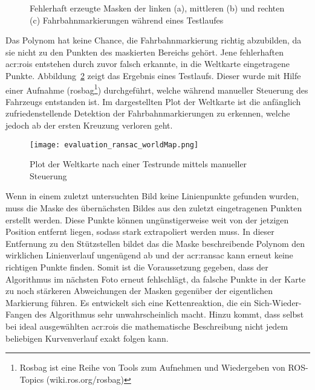 \begin{figure}[htbp]
	\centering
	\hfill
	\hfill
	\caption{Fehlerhaft erzeugte Masken der linken (a), mittleren (b) und rechten (c) Fahrbahnmarkierungen während eines Testlaufes}
	\label{fig:evaluation_ransac_ransac}
\end{figure} 

Das Polynom hat keine Chance, die Fahrbahnmarkierung richtig abzubilden, da sie nicht zu den Punkten des maskierten Bereichs gehört. Jene fehlerhaften \glspl{acr:roi} entstehen durch zuvor falsch erkannte, in die Weltkarte eingetragene Punkte. Abbildung~\ref{evaluation_ransac_weltkarte} zeigt das Ergebnis eines Testlaufs. Dieser wurde mit Hilfe einer Aufnahme (rosbag\footnote{Rosbag ist eine Reihe von Tools zum Aufnehmen und Wiedergeben von ROS-Topics (wiki.ros.org/rosbag)}) durchgeführt, welche während manueller Steuerung des Fahrzeugs entstanden ist. Im dargestellten Plot der Weltkarte ist die anfänglich zufriedenstellende Detektion der Fahrbahnmarkierungen zu erkennen, welche jedoch ab der ersten Kreuzung verloren geht.

\begin{figure}[htbp] %
	\centering
	\texttt{[image: evaluation\_ransac\_worldMap.png]}
	\caption{Plot der Weltkarte nach einer Testrunde mittels manueller Steuerung}
	\label{evaluation_ransac_weltkarte}
\end{figure} 

Wenn in einem zuletzt untersuchten Bild keine Linienpunkte gefunden wurden, muss die Maske des übernächsten Bildes aus den zuletzt eingetragenen Punkten erstellt werden. Diese Punkte können ungünstigerweise weit von der jetzigen Position entfernt liegen, sodass stark extrapoliert werden muss. In dieser Entfernung zu den Stützstellen bildet das die Maske beschreibende Polynom den wirklichen Linienverlauf ungenügend ab und der \gls{acr:ransac} kann erneut keine richtigen Punkte finden. Somit ist die Voraussetzung gegeben, dass der Algorithmus im nächsten Foto erneut fehlschlägt, da falsche Punkte in der Karte zu noch stärkeren Abweichungen der Masken gegenüber der eigentlichen Markierung führen. Es entwickelt sich eine Kettenreaktion, die ein \glqq Sich-Wieder-Fangen\grqq{} des Algorithmus sehr unwahrscheinlich macht. 
Hinzu kommt, dass selbst bei ideal ausgewählten \glspl{acr:roi} die mathematische Beschreibung nicht jedem beliebigen Kurvenverlauf exakt folgen kann. 


